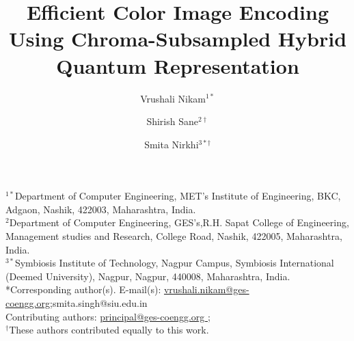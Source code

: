 \documentclass[11pt,a4paper]{article}
\begin{document}


\title{Efficient Color Image Encoding Using Chroma-Subsampled Hybrid Quantum Representation}


\makeatletter
\newcommand{\fnm}[1]{#1}
\newcommand{\sur}[1]{\textbf{#1}}
\newcommand{\orgdiv}[1]{#1}
\newcommand{\orgname}[1]{#1}
\newcommand{\street}[1]{#1}
\newcommand{\city}[1]{#1}
\newcommand{\postcode}[1]{#1}
\newcommand{\state}[1]{#1}
\newcommand{\country}[1]{#1}
\newcommand{\orgaddress}[1]{#1}
\makeatother

\author{%
Vrushali Nikam$^{1*}$ \and
Shirish Sane$^{2\dagger}$ \and
Smita Nirkhi$^{3*\dagger}$%
}

\date{}

\maketitle
\thispagestyle{empty}

\vspace{-2em}
\begin{center}
\small
$^{1*}$\orgdiv{Department of Computer Engineering}, \orgname{MET’s Institute of Engineering, BKC}, \orgaddress{\street{Adgaon}, \city{Nashik}, \postcode{422003}, \state{Maharashtra}, \country{India}}.\\[0.3em]
$^{2}$\orgdiv{Department of Computer Engineering}, \orgname{GES's,R.H. Sapat College of Engineering, Management studies and Research}, \orgaddress{\street{College Road}, \city{Nashik}, \postcode{422005}, \state{Maharashtra}, \country{India}}.\\[1em]
$^{3*}$\orgdiv{Symbiosis Institute of Technology, Nagpur Campus}, \orgname{Symbiosis International (Deemed University)}, \orgaddress{\street{Nagpur}, \city{Nagpur}, \postcode{440008}, \state{Maharashtra}, \country{India}}.\\[0.3em]
*Corresponding author(s). E-mail(s): \href{vrushali.nikam@ges-coengg.org}{vrushali.nikam@ges-coengg.org};{smita.singh@siu.edu.in}\\
Contributing authors: \href{mailto:principal@ges-coengg.org }{principal@ges-coengg.org };\\[0.5em]
$^\dagger$These authors contributed equally to this work.
\end{center}
\vspace{1em}
\end{document}
